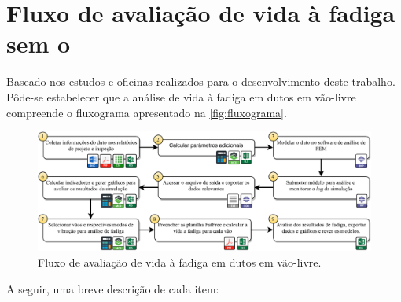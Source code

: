 \section{Fluxo de avaliação de vida à fadiga sem o \frame}\label{sec:workflow}


Baseado nos estudos e oficinas realizados para o desenvolvimento deste trabalho. Pôde-se estabelecer que a análise de vida à fadiga em dutos em vão-livre compreende o fluxograma apresentado na \autoref{fig:fluxograma}. %

\begin{figure}[!ht]
    \centering
    \caption{Fluxo de avaliação de vida à fadiga em dutos em vão-livre.}\label{fig:fluxograma}
    \includegraphics[width=\textwidth]{imagens/fluxograma.pdf}
\end{figure}

A seguir, uma breve descrição de cada item:

